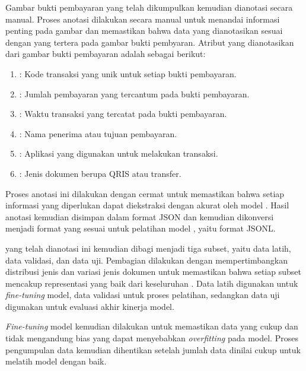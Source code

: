 Gambar bukti pembayaran yang telah dikumpulkan kemudian dianotasi secara manual. Proses anotasi dilakukan secara manual untuk menandai informasi penting pada gambar dan memastikan bahwa data yang dianotasikan sesuai dengan yang tertera pada gambar bukti pembyaran. Atribut yang dianotasikan dari gambar bukti pembayaran adalah sebagai berikut:
\begin{enumerate}
    \item \iden{}: Kode transaksi yang unik untuk setiap bukti pembayaran.
    \item \total{}: Jumlah pembayaran yang tercantum pada bukti pembayaran.
    \item \ttime{}: Waktu transaksi yang tercatat pada bukti pembayaran.
    \item \target{}: Nama penerima atau tujuan pembayaran.
    \item \app{}: Aplikasi yang digunakan untuk melakukan transaksi.
    \item \type{}: Jenis dokumen berupa QRIS atau transfer.
\end{enumerate}

Proses anotasi ini dilakukan dengan cermat untuk memastikan bahwa setiap informasi yang diperlukan dapat diekstraksi dengan akurat oleh model \donut{}. Hasil anotasi kemudian disimpan dalam format JSON dan kemudian dikonversi menjadi format yang sesuai untuk pelatihan model \donut{}, yaitu format JSONL. 

\datasetfl{} yang telah dianotasi ini kemudian dibagi menjadi tiga subset, yaitu data latih, data validasi, dan data uji. Pembagian dilakukan dengan mempertimbangkan distribusi jenis dan variasi jenis dokumen untuk memastikan bahwa setiap subset mencakup representasi yang baik dari keseluruhan \dataset. Data latih digunakan untuk \emph{fine-tuning} model, data validasi untuk proses pelatihan, sedangkan data uji digunakan untuk evaluasi akhir kinerja model. 

\emph{Fine-tuning} model kemudian dilakukan untuk memastikan data yang cukup dan tidak mengandung bias yang dapat menyebabkan \emph{overfitting} pada model. Proses pengumpulan data kemudian dihentikan setelah jumlah data dinilai cukup untuk melatih model \donut{} dengan baik.